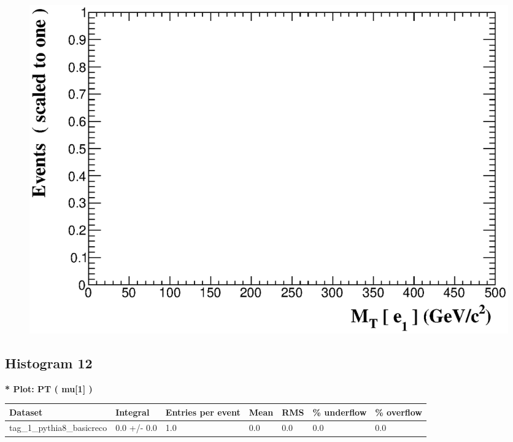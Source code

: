 \documentclass[a4paper, 10pt]{article}
\begin{document}
\begin{figure}[H]
  \begin{center}
    \includegraphics[scale=0.45]{selection_10.eps}\\
\caption{   }
  \end{center}
\end{figure}
      \newpage
\subsection{ Histogram 12}

\textbf{* Plot: PT ( mu[1] ) }\\
   \begin{table}[H]
  \begin{center}
    \begin{tabular}{|m{23.0mm}|m{23.0mm}|m{18.0mm}|m{19.0mm}|m{19.0mm}|m{19.0mm}|m{19.0mm}|}
      \hline
      {\cellcolor{yellow}         Dataset}& {\cellcolor{yellow}         Integral}& {\cellcolor{yellow}         Entries per event}& {\cellcolor{yellow}         Mean}& {\cellcolor{yellow}         RMS}& {\cellcolor{yellow}         \% underflow}& {\cellcolor{yellow}         \% overflow}\\
      \hline
      {\cellcolor{white}         tag\_1\_pythia8\_basicreco}& {\cellcolor{white}         0.0 +/\-- 0.0}& {\cellcolor{white}         1.0}& {\cellcolor{white}         0.0}& {\cellcolor{white}         0.0}& {\cellcolor{green}         0.0}& {\cellcolor{green}         0.0}\\
\hline
    \end{tabular}
  \end{center}
\end{table}
\end{document}
